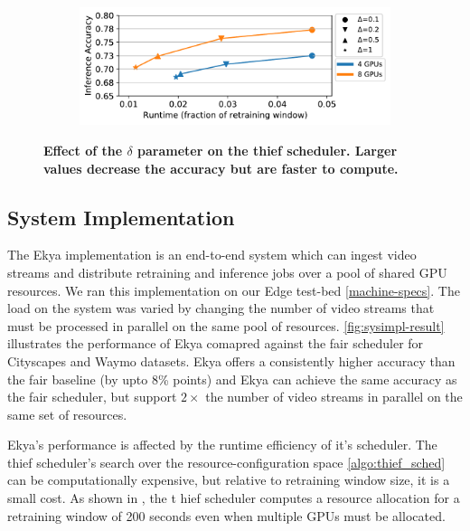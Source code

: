 \begin{figure}
  \centering
  \begin{subfigure}[t]{\linewidth}
    \centering
    \includegraphics[width=\linewidth]{results/sensitivity/sensitivity_delta_acc_runtime_cityscapes_48gpu.pdf}
  \end{subfigure}
  \caption{\bf Effect of the $\delta$ parameter on the thief scheduler. Larger values decrease the accuracy but are faster to compute.}
  \label{fig:sensitivity-delta}
\end{figure}

\subsection{System Implementation}
The Ekya implementation is an end-to-end system which can ingest video streams and distribute retraining and inference jobs over a pool of shared GPU resources. We ran this implementation on our Edge test-bed \ref{machine-specs}. The load on the system was varied by changing the number of video streams that must be processed in parallel on the same pool of resources. \cref{fig:sysimpl-result} illustrates the performance of Ekya comapred against the fair scheduler for Cityscapes and Waymo datasets. Ekya offers a consistently higher accuracy than the fair baseline (by upto 8\% points) and Ekya can achieve the same accuracy as the fair scheduler, but support $2\times$ the number of video streams in parallel on the same set of resources.

Ekya's performance is affected by the runtime efficiency of it's scheduler. The thief scheduler's search over the resource-configuration space \ref{algo:thief_sched} can be computationally expensive, but relative to retraining window size, it is a small cost. As shown in , the t  hief scheduler computes a resource allocation for a retraining window of 200 seconds even when multiple GPUs must be allocated.

